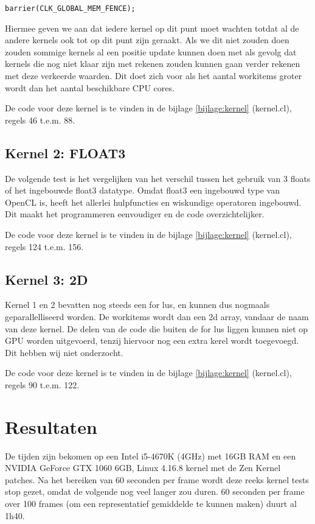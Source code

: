 \documentclass[a4paper]{article}
\begin{document}
\begin{lstlisting}
barrier(CLK_GLOBAL_MEM_FENCE);
\end{lstlisting}

Hiermee geven we aan dat iedere kernel op dit punt moet wachten totdat al de andere kernels ook tot op dit punt zijn geraakt. Als we dit niet zouden doen zouden sommige kernels al een positie update kunnen doen met als gevolg dat kernels die nog niet klaar zijn met rekenen zouden kunnen gaan verder rekenen met deze verkeerde waarden. Dit doet zich voor als het aantal workitems groter wordt dan het aantal beschikbare CPU cores.

De code voor deze kernel is te vinden in de bijlage \ref{bijlage:kernel} (kernel.cl), regels 46 t.e.m. 88.

\subsection{Kernel 2: FLOAT3}

De volgende test is het vergelijken van het verschil tussen het gebruik van 3 floats of het ingebouwde float3 datatype.
Omdat float3 een ingebouwd type van OpenCL is, heeft het allerlei hulpfuncties en wiskundige operatoren ingebouwd. Dit maakt het programmeren eenvoudiger en de code overzichtelijker.

De code voor deze kernel is te vinden in de bijlage \ref{bijlage:kernel} (kernel.cl), regels 124 t.e.m. 156.

\subsection{Kernel 3: 2D}

Kernel 1 en 2 bevatten nog steeds een for lus, en kunnen dus nogmaals geparallelliseerd worden. De workitems wordt dan een 2d array, vandaar de naam van deze kernel.
De delen van de code die buiten de for lus liggen kunnen niet op GPU worden uitgevoerd, tenzij hiervoor nog een extra kerel wordt toegevoegd. Dit hebben wij niet onderzocht.

De code voor deze kernel is te vinden in de bijlage \ref{bijlage:kernel} (kernel.cl), regels 90 t.e.m. 122.

\section{Resultaten}\label{section:resultaten}

De tijden zijn bekomen op een Intel i5-4670K (4GHz) met 16GB RAM en een NVIDIA GeForce GTX 1060 6GB, Linux 4.16.8 kernel met de Zen Kernel patches.
Na het bereiken van 60 seconden per frame wordt deze reeks kernel tests stop gezet, omdat de volgende nog veel langer zou duren. 60 seconden per frame over 100 frames (om een representatief gemiddelde te kunnen maken) duurt al 1h40.
\end{document}
